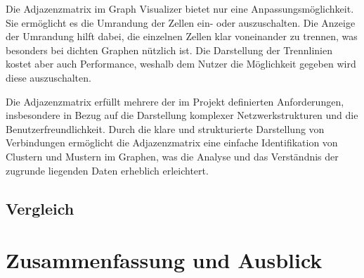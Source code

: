 Die Adjazenzmatrix im Graph Visualizer bietet nur eine Anpassungsmöglichkeit. Sie ermöglicht es die Umrandung der Zellen ein- oder auszuschalten. Die Anzeige der Umrandung hilft dabei, die einzelnen Zellen klar voneinander zu trennen, was besonders bei dichten Graphen nützlich ist. Die Darstellung der Trennlinien kostet aber auch Performance, weshalb dem Nutzer die Möglichkeit gegeben wird diese auszuschalten.

Die Adjazenzmatrix erfüllt mehrere der im Projekt definierten Anforderungen, insbesondere in Bezug auf die Darstellung komplexer Netzwerkstrukturen und die Benutzerfreundlichkeit. Durch die klare und strukturierte Darstellung von Verbindungen ermöglicht die Adjazenzmatrix eine einfache Identifikation von Clustern und Mustern im Graphen, was die Analyse und das Verständnis der zugrunde liegenden Daten erheblich erleichtert.

\section{Vergleich}
\label{realization:comparison}

\chapter{Zusammenfassung und Ausblick}